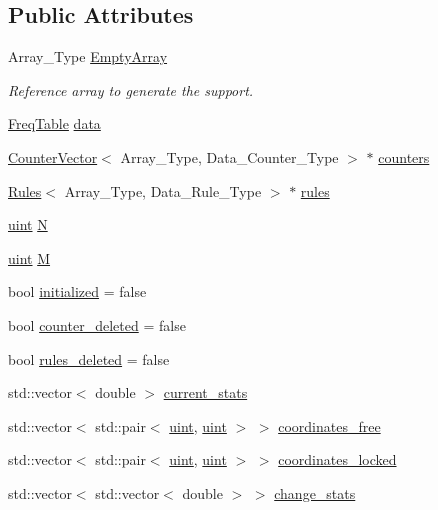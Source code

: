 \subsection*{Public Attributes}
\begin{DoxyCompactItemize}
\item 
Array\+\_\+\+Type \hyperlink{classbarry_1_1_support_a2eec6569a9206965a679782f7acf12e5}{Empty\+Array}
\begin{DoxyCompactList}\small\item\em Reference array to generate the support. \end{DoxyCompactList}\item 
\hyperlink{classbarry_1_1_freq_table}{Freq\+Table} \hyperlink{classbarry_1_1_support_ab58b9801dcbb924d68fd18db0821de99}{data}
\item 
\hyperlink{classbarry_1_1_counter_vector}{Counter\+Vector}$<$ Array\+\_\+\+Type, Data\+\_\+\+Counter\+\_\+\+Type $>$ $\ast$ \hyperlink{classbarry_1_1_support_ab1d697b1f970b160db6d5f76d602bb3c}{counters}
\item 
\hyperlink{classbarry_1_1_rules}{Rules}$<$ Array\+\_\+\+Type, Data\+\_\+\+Rule\+\_\+\+Type $>$ $\ast$ \hyperlink{classbarry_1_1_support_a9311c3288f59feaece0680f9a7b630dd}{rules}
\item 
\hyperlink{namespacebarry_a11dfc53ddb4672278319aa04f1e09a6c}{uint} \hyperlink{classbarry_1_1_support_a776221deb92d113e5dee1cb100174ed4}{N}
\item 
\hyperlink{namespacebarry_a11dfc53ddb4672278319aa04f1e09a6c}{uint} \hyperlink{classbarry_1_1_support_abdf54592050a1c0db0fc7b079a7f9703}{M}
\item 
bool \hyperlink{classbarry_1_1_support_a4a9c004b1a42b5c3954319dec6211a0c}{initialized} = false
\item 
bool \hyperlink{classbarry_1_1_support_a5de08029a7262ba86df728c8b8427999}{counter\+\_\+deleted} = false
\item 
bool \hyperlink{classbarry_1_1_support_ab06f3a207f1d647d327a815bcedba9dd}{rules\+\_\+deleted} = false
\item 
std\+::vector$<$ double $>$ \hyperlink{classbarry_1_1_support_aa69d5a47e5ee039b19f42edacd5453d4}{current\+\_\+stats}
\item 
std\+::vector$<$ std\+::pair$<$ \hyperlink{namespacebarry_a11dfc53ddb4672278319aa04f1e09a6c}{uint}, \hyperlink{namespacebarry_a11dfc53ddb4672278319aa04f1e09a6c}{uint} $>$ $>$ \hyperlink{classbarry_1_1_support_aa235837435a5ed7ac540481676333b88}{coordinates\+\_\+free}
\item 
std\+::vector$<$ std\+::pair$<$ \hyperlink{namespacebarry_a11dfc53ddb4672278319aa04f1e09a6c}{uint}, \hyperlink{namespacebarry_a11dfc53ddb4672278319aa04f1e09a6c}{uint} $>$ $>$ \hyperlink{classbarry_1_1_support_a3abcd564b19c7399b596a5b63c72b149}{coordinates\+\_\+locked}
\item 
std\+::vector$<$ std\+::vector$<$ double $>$ $>$ \hyperlink{classbarry_1_1_support_a37c139514065d10807cd574ca748744b}{change\+\_\+stats}
\end{DoxyCompactItemize}


